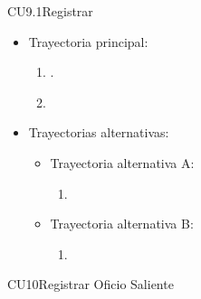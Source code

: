 \newpage
\begin{UseCase}{CU9.1}{Registrar }{}
	\UCitem{}{}
\end{UseCase}

\begin{itemize}	
	\item Trayectoria principal:
		\begin{enumerate}
			\item {}.
			\item 
		\end{enumerate}
	\item Trayectorias alternativas:
		\begin{itemize}
			\item Trayectoria alternativa A: 
				\begin{enumerate}
					\item 
				\end{enumerate}
			\item Trayectoria alternativa B: 
				\begin{enumerate}
					\item 
				\end{enumerate}
		\end{itemize}
\end{itemize}

\newpage

\begin{UseCase}{CU10}{Registrar Oficio Saliente}{}
	\UCitem{}{}
\end{UseCase}

